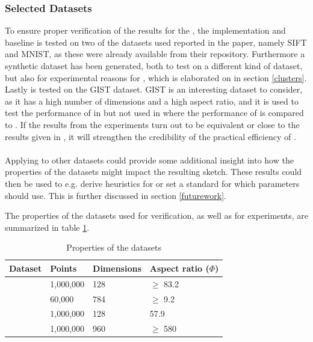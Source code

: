 \subsubsection{Selected Datasets}
\label{datasets}
To ensure proper verification of the results for the \qs{}, the implementation and baseline is tested on two of the datasets used reported in the paper, namely SIFT and MNIST, as these were already available from their repository. Furthermore a synthetic dataset has been generated, both to test \qs{} on a different kind of dataset, but also for experimental reasons for \qsr{}, which is elaborated on in section \ref{clusters}. 
\\
Lastly \qs{} is tested on the GIST dataset. %
GIST is an interesting dataset to consider, as it has a high number of dimensions and a high aspect ratio, and it is used to test the performance of \pq{} in \cite{schmid9} but not used in \cite{wagner17} where the performance of \qs{} is compared to \pq{}. If the results from the experiments turn out to be equivalent or close to the results given in \cite{wagner17}, it will strengthen the credibility of the practical efficiency of \qs{}. 
\\
\\
Applying \qs{} to other datasets could provide some additional insight into how the properties of the datasets might impact the resulting sketch. These results could then be used to e.g. derive heuristics for \qs{} or set a standard for which parameters \qs{} should use. This is further discussed in section \ref{futurework}.

The properties of the datasets used for verification, as well as for experiments, are summarized in table \ref{tab:datasets}.

\begin{table}[h]
	\centering
	\begin{tabular}{l l l l}
		\hline
		Dataset & Points & Dimensions & Aspect ratio ($\Phi$) \\
		\hline
		\sift{} & 1,000,000 & 128 & $\geq$ 83.2 \\
		\mnist{} & 60,000 & 784 & $\geq$ 9.2 \\
		\clust{} & 1,000,000 & 128 & 57.9 \\
		\gist{} & 1,000,000 & 960 & $\geq$ 580 \\
		\hline
	\end{tabular}
	\caption{Properties of the datasets}
	\label{tab:datasets}
\end{table}


